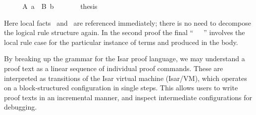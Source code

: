 \begin{isabellebody}
\begin{minipage}{0.5\textwidth}
\ {}\isanewline
\ \ \isamarkupfalse%
\ {}A\ a{}\ \ {}B\ b{}%
\endisatagproof
{\isafoldproof}%
%
\isadelimproof
%
\endisadelimproof
%
\isadelimnoproof
\ %
\endisadelimnoproof
%
\isatagnoproof
{}\isamarkupfalse%
%
\endisatagnoproof
{\isafoldnoproof}%
%
\isadelimnoproof
\isanewline
%
\endisadelimnoproof
%
\isadelimproof
\ \ %
\endisadelimproof
%
\isatagproof
{}\isamarkupfalse%
\ \isamarkupfalse%
\ thesis\ \isamarkupfalse%
\isanewline
{}\isamarkupfalse%
%
\endisatagproof
{\isafoldproof}%
%
\isadelimproof
%
\endisadelimproof
%
\end{minipage}
%
\begin{isamarkuptext}%
\medskip\noindent Here local facts \isacharbackquoteopen{}\isacharbackquoteclose\ and \isacharbackquoteopen{}\isacharbackquoteclose\ are referenced immediately; there is no
  need to decompose the logical rule structure again.  In the second
  proof the final ``\hyperlink{command.then}{\mbox{}}~\hyperlink{command.show}{\mbox{}}~~\hyperlink{command.ddot}{\mbox{}}''  involves the local rule case  for the particular instance of terms  and  produced in the body.%
\end{isamarkuptext}%
\isamarkuptrue%
%
\isamarkuptrue%
%
\begin{isamarkuptext}%
By breaking up the grammar for the Isar proof language, we may
  understand a proof text as a linear sequence of individual proof
  commands.  These are interpreted as transitions of the Isar virtual
  machine (Isar/VM), which operates on a block-structured
  configuration in single steps.  This allows users to write proof
  texts in an incremental manner, and inspect intermediate
  configurations for debugging.


\end{isamarkuptext}
\end{isabellebody}
